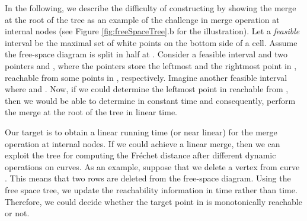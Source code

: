 \documentclass[12pt]{dalthesis}
\newcommand{\REM}[1]{}
\newcommand{\Frechet}{Fr\'echet }
\begin{document}
{{In the following, we describe the difficulty of constructing  by showing the merge at 
the root of the tree as an example of the challenge in merge operation at internal nodes 
(see Figure \ref{fig:freeSpaceTree}.b for the illustration).
Let  a {\em feasible }interval be the maximal set of white points on the bottom side of a cell. 
Assume the free-space diagram is split in half 
at . Consider a feasible interval  and 
two pointers  and , where the pointers store the leftmost and 
the rightmost point in , reachable from some points in , respectively. 
Imagine another feasible interval 
where   and .
Now, if we could determine the leftmost point in  reachable from , then 
we would be able to determine  in constant time
and consequently, perform the merge at the root of the tree in linear time. 

Our target is to obtain a linear running time
(or near linear) for the merge operation at internal nodes. 
If we could achieve a linear merge, then we can exploit the tree for computing 
the \Frechet distance after different dynamic operations on curves. 
As an example, suppose that we delete a vertex 
from curve . This means that two rows are deleted from the free-space diagram. 
Using the free space tree, we update the reachability information 
in  time rather than  time. Therefore, 
we could decide whether the target point in  is monotonically reachable or not. 
}






\REM{
\begin{figure}[h]
	\centering
	\texttt{[image: Pics/Freespacetree2]}
	\caption{ The free space tree is built on the top of the free-space diagram}
	\label{fig:freeSpaceTree}
\end{figure}
}


\REM{
We would also want to investigate about 
computing \Frechet distance in the following setting.
Consider a polygonal curve  corresponding to the trajectory 
of a moving vehicle. Assume that to each edge of , a parameter {\em weight}
is associated, which shows the accuracy of the sampling around that edge.
Our goal is to compute the \Frechet distance between two curves 
taking into consideration the weights on the edges. 
In this setting, the free space inside each cell in the free-space diagram 
corresponding to the curves, shrinks. To solve the decision problem, 
one needs to first discover the properties of the free space inside each cell, 
whether it is convex or -monotone or if it is connected or not. 
Next, the boundary of the free space inside the cells must be computed.
Finally, the free-space diagram is searched to find a monotone path from the bottom-left corner to the top-right corner. 
}








}
\end{document}
